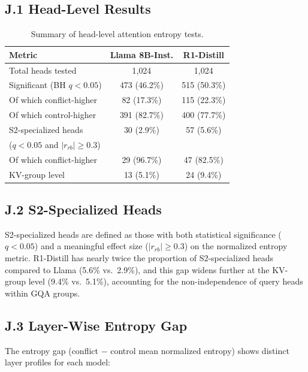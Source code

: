 \documentclass[accepted]{article}
\begin{document}
\subsection*{J.1 Head-Level Results}

\begin{table}[ht]
\centering
\caption{Summary of head-level attention entropy tests.}
\label{tab:attention_heads}
\vspace{4pt}
\small
\begin{tabular}{lcc}
\toprule
\textbf{Metric} & \textbf{Llama 8B-Inst.} & \textbf{R1-Distill} \\
\midrule
Total heads tested                 & 1{,}024 & 1{,}024 \\
Significant (BH $q < 0.05$)       & 473 (46.2\%) & 515 (50.3\%) \\
\quad Of which conflict-higher     & 82 (17.3\%) & 115 (22.3\%) \\
\quad Of which control-higher      & 391 (82.7\%) & 400 (77.7\%) \\
\midrule
S2-specialized heads               & 30 (2.9\%)  & 57 (5.6\%) \\
\quad ($q < 0.05$ and $|r_{rb}| \geq 0.3$) & & \\
\quad Of which conflict-higher     & 29 (96.7\%) & 47 (82.5\%) \\
\quad KV-group level               & 13 (5.1\%)  & 24 (9.4\%) \\
\bottomrule
\end{tabular}
\end{table}

\subsection*{J.2 S2-Specialized Heads}

S2-specialized heads are defined as those with both statistical
significance ($q < 0.05$) and a meaningful effect size ($|r_{rb}|
\geq 0.3$) on the normalized entropy metric.  R1-Distill has
nearly twice the proportion of S2-specialized heads compared to
Llama (5.6\% vs.\ 2.9\%), and this gap widens further at the
KV-group level (9.4\% vs.\ 5.1\%), accounting for the
non-independence of query heads within GQA groups.

\subsection*{J.3 Layer-Wise Entropy Gap}

The entropy gap (conflict $-$ control mean normalized entropy) shows
distinct layer profiles for each model:
\end{document}

